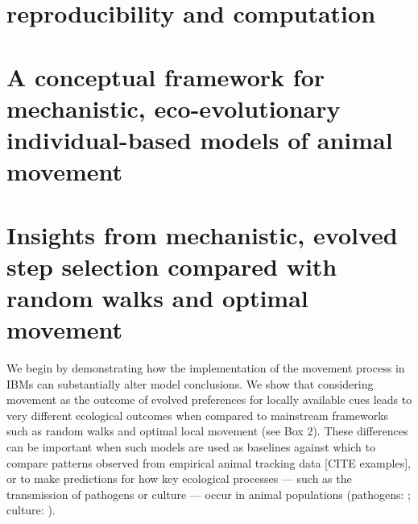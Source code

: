 \section{reproducibility and computation}

\section*{A conceptual framework for mechanistic, eco-evolutionary individual-based models of animal movement}




\section*{Insights from mechanistic, evolved step selection compared with random walks and optimal movement}

We begin by demonstrating how the implementation of the movement process in IBMs can substantially alter model conclusions.
We show that considering movement as the outcome of evolved preferences for locally available cues leads to very different ecological outcomes when compared to mainstream frameworks such as random walks and optimal local movement (see Box 2).
These differences can be important when such models are used as baselines against which to compare patterns observed from empirical animal tracking data [CITE examples], or to make predictions for how key ecological processes --- such as the transmission of pathogens or culture --- occur in animal populations (pathogens: \cite{white2018,white2018b,cantor2021,scherer2020}; culture: \cite{romano2020,romano2021,cantor2021,cantor2021a}).

